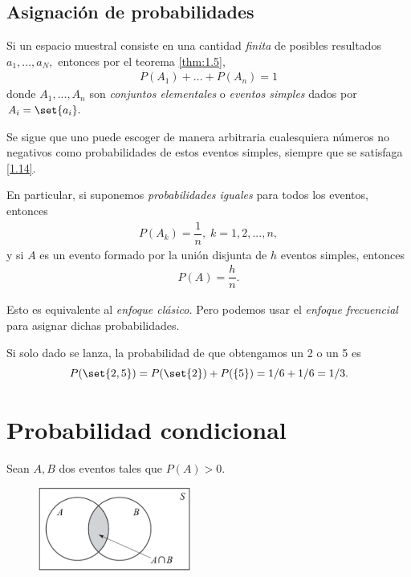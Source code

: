 \subsection{Asignación de probabilidades}
 {}
 Si un espacio muestral consiste en una cantidad \emph{finita} de posibles resultados $a_{1},...,a_{N},$ entonces por el teorema \ref{thm:1.5},
 \begin{align}
  \label{1.14}
  P(A_{1})+...+P(A_{n})=1
 \end{align}
 donde $A_{1},...,A_{n}$ son \emph{conjuntos elementales} o \emph{eventos simples} dados por $A_{i}=\set{a_{i}}.$


{}
Se sigue que uno puede escoger de manera arbitraria cualesquiera números no negativos como probabilidades de estos eventos simples, siempre que se satisfaga \eqref{1.14}. 

En particular, si suponemos \emph{probabilidades iguales} para todos los eventos, entonces
\begin{align}
 \label{1.15}
 P(A_{k})=\dfrac{1}{n}, \; k=1,2,...,n,
\end{align}
y si $A$ es un evento formado por la unión disjunta de $h$ eventos simples, entonces
\begin{align}
	\label{1.16}
 P(A)=\dfrac{h}{n}.
\end{align}


{}
\begin{rem}
 Esto es equivalente al \textit{enfoque clásico.} Pero podemos usar el \textit{enfoque frecuencial} para asignar dichas probabilidades.
\end{rem}


{}
\begin{ejemplo}
 \label{exmp:1.12}
 Si solo dado se lanza, la probabilidad de que obtengamos un 2 o un 5 es 
 \[ P(\set{2,5}) = P(\set{2}) + P(\{5\}) = 1/6 + 1/6 = 1/3. \]
\end{ejemplo}




 \section{Probabilidad condicional}
{}
Sean $A,B$ dos eventos tales que $P(A)>0.$
\begin{figure}
 \centering
 \includegraphics[width=5cm,keepaspectratio=true]{./pe/pands0103.png}
 \label{pands0103}
\end{figure}

